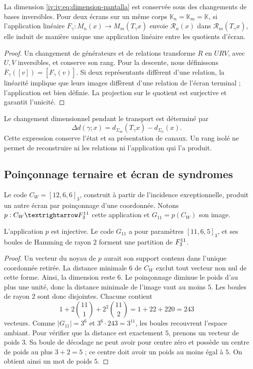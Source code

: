 \begin{proposition}
\label{iv:iv:prop:pantalla-transporte}
La dimension \eqref{iv:iv:eq:dimension-pantalla} est conservée
sous des changements de bases inversibles. Pour deux écrans sur un même corps
\(\mathbb K_n=\mathbb K_m=\mathbb K\), si l’application linéaire
\(F_\gamma:M_n(x)\to M_m(T_\gamma x)\) envoie
\(\mathcal R_n(x)\) dans \(\mathcal R_m(T_\gamma x)\), elle induit
de manière unique une application linéaire entre les quotients d’écran.
\end{proposition}
\begin{proof}
Un changement de générateurs et de relations transforme \(R\) en
\(URV\), avec \(U,V\) inversibles, et conserve son rang. Pour
la descente, nous définissons
\(\overline F_\gamma([v])=[F_\gamma(v)]\). Si deux
représentants diffèrent d’une relation, la linéarité implique que leurs images diffèrent
d’une relation de l’écran terminal ; l’application est
bien définie. La projection sur le quotient est surjective et
garantit l’unicité.
\end{proof}

Le changement dimensionnel pendant le transport est déterminé
par
\[
 \Delta d(\gamma;x)=d_{\Sigma_m}(T_\gamma x)
                         -d_{\Sigma_n}(x).
\]
Cette expression conserve l’état et sa présentation de canaux.
Un rang isolé ne permet de reconstruire ni les relations ni
l’application qui l’a produit.

\subsection{Poinçonnage ternaire et écran de syndromes}

Le code \(C_W=[12,6,6]_3\), construit à partir de
l’incidence exceptionnelle, produit un autre écran par
poinçonnage d’une coordonnée. Notons
\(p:C_W\to\FF_3^{11}\) cette application et
\(G_{11}=p(C_W)\) son image.

\begin{proposition}
\label{iv:iv:prop:codigo-once}
L’application \(p\) est injective. Le code \(G_{11}\) a pour
paramètres \([11,6,5]_3\), et ses boules de Hamming de rayon
\(2\) forment une partition de \(F_3^{11}\).
\end{proposition}
\begin{proof}
Un vecteur du noyau de \(p\) aurait son support contenu dans
l’unique coordonnée retirée. La distance minimale \(6\)
de \(C_W\) exclut tout vecteur non nul de cette forme.
Ainsi, la dimension reste \(6\). Le poinçonnage diminue
le poids d’au plus une unité, donc la distance minimale
de l’image vaut au moins \(5\). Les boules de rayon \(2\)
sont donc disjointes. Chacune contient
\[
 1+2\binom{11}{1}+2^2\binom{11}{2}
 =1+22+220=243
\]
vecteurs. Comme \(|G_{11}|=3^6\) et
\(3^6\cdot243=3^{11}\), les boules recouvrent l’espace ambiant.
Pour vérifier que la distance est exactement \(5\),
prenons un vecteur de poids \(3\). Sa boule de décodage
ne peut avoir pour centre zéro et possède un centre de poids au
plus \(3+2=5\) ; ce centre doit avoir un poids au moins égal à
\(5\). On obtient ainsi un mot de poids \(5\).
\end{proof}

